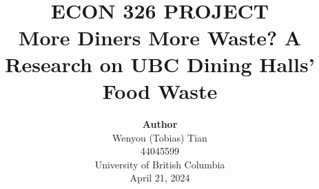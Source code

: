\title{ \normalsize \textsc{}
		\\ [2.0cm]
		\HRule{1.5pt} \\
		\LARGE \textbf{\uppercase{ECON 326 Project}
		\HRule{2.0pt} \\ [0.6cm] \LARGE{More Diners More Waste? A Research on UBC Dining Halls' Food Waste} \vspace*{10\baselineskip}}
		}
\date{}
\author{\textbf{Author} \\ 
		Wenyou (Tobias) Tian \\
        44045599 \\
		University of British Columbia \\
		April 21, 2024}

\maketitle
\newpage

\tableofcontents
\newpage